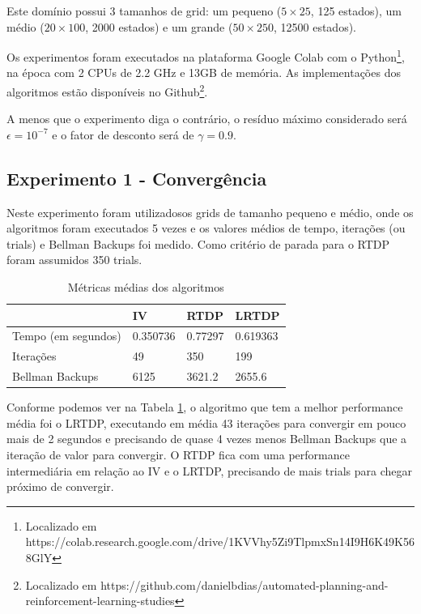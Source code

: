 \documentclass[letterpaper]{article}
\begin{document}
Este domínio possui 3 tamanhos de grid: um pequeno ($5 \times 25$, 125 estados), um médio ($20 \times 100$, 2000 estados) e um grande ($50 \times 250$, 12500 estados).

Os experimentos foram executados na plataforma Google Colab com o Python\footnote{Localizado em https://colab.research.google.com/drive/1KVVhy5Zi9TlpmxSn14I9H6K49K568GlY}, na época com 2 CPUs de 2.2 GHz e 13GB de memória. As implementações dos algoritmos estão disponíveis no Github\footnote{Localizado em https://github.com/danielbdias/automated-planning-and-reinforcement-learning-studies}.

A menos que o experimento diga o contrário, o resíduo máximo considerado será $ \epsilon = 10^{-7} $ e o fator de desconto será de $\gamma = 0.9$.

\subsection{Experimento 1 - Convergência}

Neste experimento foram utilizadosos grids de tamanho pequeno e médio, onde os algoritmos foram executados 5 vezes e os valores médios de tempo, iterações (ou trials) e Bellman Backups foi medido. Como critério de parada para o RTDP foram assumidos 350 trials.

\begin{table}[ht]
    \caption{Métricas médias dos algoritmos}
    \label{table:exp1-mean-values}
    \begin{tabular}{llll}
        \toprule
        {}                  &       IV &      RTDP &     LRTDP \\
        \midrule
        Tempo (em segundos) & 0.350736 &  0.77297 &  0.619363 \\
        Iterações           &       49 &      350 &       199 \\
        Bellman Backups     &     6125 &   3621.2 &    2655.6 \\
        \bottomrule
    \end{tabular}
\end{table}

Conforme podemos ver na Tabela \ref{table:exp1-mean-values}, o algoritmo que tem a melhor performance média foi o LRTDP, executando em média 43 iterações para convergir em pouco mais de 2 segundos e precisando de quase 4 vezes menos Bellman Backups que a iteração de valor para convergir. O RTDP fica com uma performance intermediária em relação ao IV e o LRTDP, precisando de mais trials para chegar próximo de convergir.
\end{document}
